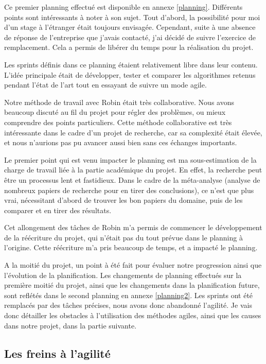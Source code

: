 \documentclass[openany, 11pt]{memoir}
\begin{document}
Ce premier planning effectué est disponible en annexe \ref{planning}. Différents points sont intéressants à noter à son sujet. Tout d'abord, la possibilité pour moi d'un stage à l'étranger était toujours envisagée. Cependant, suite à une absence de réponse de l'entreprise que j'avais contacté, j'ai décidé de suivre l'exercice de remplacement. Cela a permis de libérer du temps pour la réalisation du projet.

Les sprints définis dans ce planning étaient relativement libre dans leur contenu. L'idée principale était de développer, tester et comparer les algorithmes retenus pendant l'état de l'art tout en essayant de suivre un mode agile.

\bigskip
Notre méthode de travail avec Robin était très collaborative. Nous avons beaucoup discuté au fil du projet pour régler des problèmes, ou mieux comprendre des points particuliers. Cette méthode collaborative est très intéressante dans le cadre d'un projet de recherche, car sa complexité était élevée, et nous n'aurions pas pu avancer aussi bien sans ces échanges importants.

\bigskip
Le premier point qui est venu impacter le planning est ma sous-estimation de la charge de travail liée à la partie académique du projet. En effet, la recherche peut être un processus lent et fastidieux. Dans le cadre de la méta-analyse (analyse de nombreux papiers de recherche pour en tirer des conclusions), ce n'est que plus vrai, nécessitant d'abord de trouver les bon papiers du domaine, puis de les comparer et en tirer des résultats.

Cet allongement des tâches de Robin m'a permis de commencer le développement de la réécriture du projet, qui n'était pas du tout prévue dans le planning à l'origine. Cette réécriture m'a pris beaucoup de temps, et a impacté le planning.

\bigskip
A la moitié du projet, un point à été fait pour évaluer notre progression ainsi que l'évolution de la planification. Les changements de planning effectués sur la première moitié du projet, ainsi que les changements dans la planification future, sont reflétés dans le second planning en annexe \ref{planning2}. Les sprints ont été remplacés par des tâches précises, nous avons donc abandonné l'agilité. Je vais donc détailler les obstacles à l'utilisation des méthodes agiles, ainsi que les causes dans notre projet, dans la partie suivante.

\subsection{Les freins à l'agilité}
\end{document}

